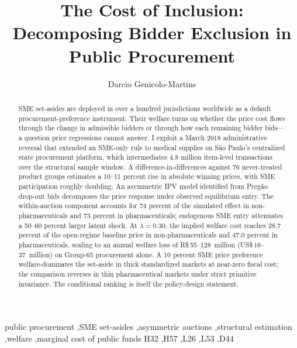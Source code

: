 \documentclass[12pt]{elsarticle}
\begin{document}
\begin{frontmatter}
\title{\textbf{The Cost of Inclusion:\\ Decomposing Bidder Exclusion in Public Procurement}}
\author[INSPER]{Darcio Genicolo-Martins}
\address[INSPER]{INSPER, S\~ao Paulo}

\begin{abstract}
SME set-asides are deployed in over a hundred jurisdictions worldwide as a default procurement-preference instrument. Their welfare turns on whether the price cost flows through the change in admissible bidders or through how each remaining bidder bids---a question price regressions cannot answer. I exploit a March 2018 administrative reversal that extended an SME-only rule to medical supplies on S\~ao Paulo's centralized state procurement platform, which intermediates 4.8 million item-level transactions over the structural sample window. A difference-in-differences against 76 never-treated product groups estimates a 10--11 percent rise in absolute winning prices, with SME participation roughly doubling. An asymmetric IPV model identified from Preg\~ao drop-out bids decomposes the price response under observed equilibrium entry. The within-auction component accounts for 74 percent of the simulated effect in non-pharmaceuticals and 73 percent in pharmaceuticals; endogenous SME entry attenuates a 50--60 percent larger latent shock. At $\lambda = 0.30$, the implied welfare cost reaches 28.7 percent of the open-regime baseline price in non-pharmaceuticals and 47.0 percent in pharmaceuticals, scaling to an annual welfare loss of R\$\,55--128~million (US\$\,16--37~million) on Group-65 procurement alone. A 10 percent SME price preference welfare-dominates the set-aside in thick standardized markets at near-zero fiscal cost; the comparison reverses in thin pharmaceutical markets under strict primitive invariance. The conditional ranking is itself the policy-design statement.
\end{abstract}

\begin{keyword}
public procurement \sep SME set-asides \sep asymmetric auctions \sep structural estimation \sep welfare \sep marginal cost of public funds
\MSC[JEL] H32 \sep H57 \sep L26 \sep L53 \sep D44
\end{keyword}

\end{frontmatter}
\end{document}
